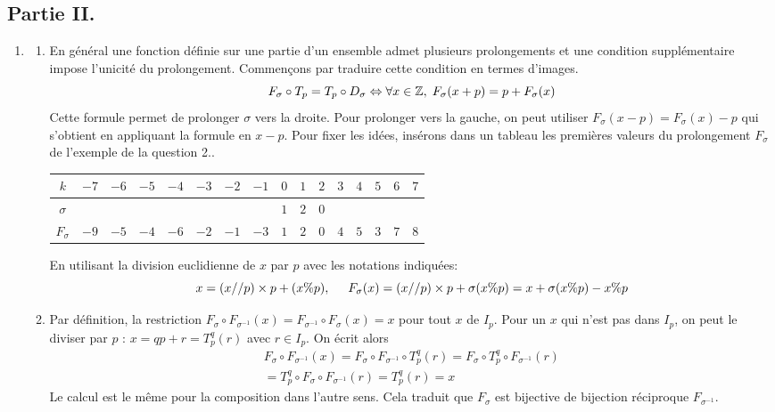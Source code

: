 \subsection*{Partie II.}
\begin{enumerate}
 \item 
\begin{enumerate}
 \item En général une fonction définie sur une partie d'un ensemble admet plusieurs prolongements et une condition supplémentaire impose l'unicité du prolongement. Commençons par traduire cette condition en termes d'images.
\begin{displaymath}
F_\sigma \circ T_p = T_p \circ D_\sigma \Leftrightarrow
\forall x\in \mathbb{Z},\; F_\sigma(x+p) = p + F_\sigma(x)
\end{displaymath}
Cette formule permet de prolonger $\sigma$ \og vers la droite\fg. Pour prolonger \og vers la gauche\fg, on peut utiliser $F_\sigma(x-p) = F_\sigma(x) - p$ qui s'obtient en appliquant la formule en $x-p$. Pour fixer les idées, insérons dans un tableau les premières valeurs du prolongement $F_\sigma$ de l'exemple de la question 2..
\begin{center}
\begin{tabular}{c|ccccccccccccccc}
$k$ & $-7$ & $-6$ & $-5$ & $-4$ & $-3$ & $-2$ & $-1$ & $0$ & $1$ & $2$ & $3$ & $4$ & $5$ & $6$ & $7$\\ \hline
$\sigma$ &  &  &  &  &  &  &  & $1$ & $2$ & $0$ &  &  &  &  & \\\hline
$F_\sigma$ & $-9$ & $-5$ & $-4$ & $-6$ & $-2$ & $-1$ & $-3$ & $1$ & $2$ & $0$ & $4$ & $5$ & $3$ & $7$ & $8$                                                                                                                                                                                                                                          \end{tabular}
\end{center}
En utilisant la division euclidienne de $x$ par $p$ avec les notations indiquées:
\begin{displaymath}
 x = (x//p)\times p + (x \% p),\hspace{0.5cm} F_\sigma(x) = (x//p)\times p + \sigma( x\% p)
 = x + \sigma( x\% p) - x\% p
\end{displaymath}

\item Par définition, la restriction $F_\sigma \circ F_{\sigma^{-1}}(x) = F_{\sigma^{-1}} \circ  F_\sigma(x) = x$ pour tout $x$ de $I_p$. Pour un $x$ qui n'est pas dans $I_p$, on peut le diviser par $p$ : $x = q p + r = T_p^{q}(r)$ avec $r\in I_p$. On écrit alors
\begin{multline*}
 F_\sigma \circ F_{\sigma^{-1}}(x)
 = F_\sigma \circ F_{\sigma^{-1}}\circ T_p^{q}(r) = F_\sigma \circ T_p^{q} \circ F_{\sigma^{-1}}(r)\\
 = T_p^{q} \circ F_\sigma \circ F_{\sigma^{-1}}(r)
 = T_p^{q}(r) = x
\end{multline*}
Le calcul est le même pour la composition dans l'autre sens. Cela traduit que $F_\sigma$ est bijective de bijection réciproque $F_{\sigma^{-1}}$.


\end{enumerate}
\end{enumerate}
